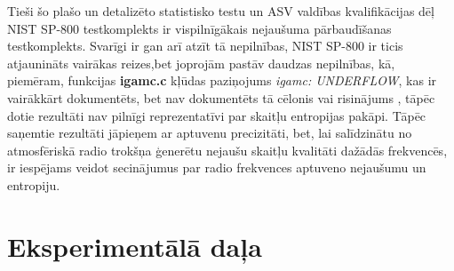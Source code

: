 \documentclass[12pt]{article}
\begin{document}
    Tieši šo plašo un detalizēto statistisko testu un ASV valdības kvalifikācijas dēļ NIST SP-800 testkomplekts ir vispilnīgākais nejaušuma pārbaudīšanas testkomplekts. 
    Svarīgi ir gan arī atzīt tā nepilnības, NIST SP-800 ir ticis atjaunināts vairākas reizes,bet joprojām pastāv daudzas nepilnības, kā, piemēram, funkcijas \textbf{igamc.c} kļūdas paziņojums \textit{igamc: UNDERFLOW}, kas ir vairākkārt dokumentēts, bet nav dokumentēts tā cēlonis vai risinājums \parencite{NIST_kludas}, tāpēc dotie rezultāti nav pilnīgi reprezentatīvi par skaitļu entropijas pakāpi. \parencite{nist_ir_slikts} Tāpēc saņemtie rezultāti jāpieņem ar aptuvenu precizitāti, bet, lai salīdzinātu no atmosfēriskā radio trokšņa ģenerētu nejaušu skaitļu kvalitāti dažādās frekvencēs, ir iespējams veidot secinājumus par radio frekvences aptuveno nejaušumu un entropiju.

    
    \pagebreak


    \section{Eksperimentālā daļa} %
\end{document}
